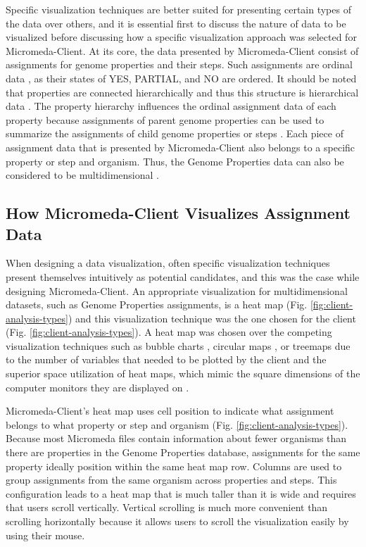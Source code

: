 Specific visualization techniques are better suited for presenting certain types 
of the data over others, and it is essential first to discuss the nature of data to 
be visualized before discussing how a specific visualization approach was 
selected for Micromeda-Client. At its core, the data presented by 
Micromeda-Client consist of assignments for genome properties and their steps. 
Such assignments are ordinal data 
\cite{richardson2018genome,agresti2010analysis}, as their states of YES, 
PARTIAL, and NO are ordered. It should be noted that properties are connected 
hierarchically \cite{richardson2018genome} and thus this structure is 
hierarchical data \cite{richardson2018genome,samet1990applications}. The 
property hierarchy influences the ordinal assignment data of each property 
because assignments of parent genome properties can be used to summarize the 
assignments of child genome properties or steps \cite{richardson2018genome}. 
Each piece of assignment data that is presented by Micromeda-Client also belongs 
to a specific property or step and organism. Thus, the Genome Properties data 
can also be considered to be multidimensional 
\cite{pedersen1999multidimensional}.

\subsection{How Micromeda-Client Visualizes Assignment Data}
\label{client-visualization}

When designing a data visualization, often specific visualization techniques 
present themselves intuitively as potential candidates, and this was the case 
while designing Micromeda-Client. An appropriate visualization for 
multidimensional datasets, such as Genome Properties assignments, is a heat map 
\cite{wilkinson2009history,tufte2001visual}(Fig. 
\ref{fig:client-analysis-types}) and this visualization technique was the one 
chosen for the client (Fig. \ref{fig:client-analysis-types}). A heat map was 
chosen over the competing visualization techniques such as bubble charts 
\cite{tufte2001visual}, circular maps 
\cite{ward2002taxonomy,stothard2004circular}, or treemaps 
\cite{shneiderman1998tree} due to the number of variables that needed to be 
plotted by the client and the superior space utilization of heat maps, which 
mimic the square dimensions of the computer monitors they are displayed on 
\cite{muramalla2017radial}.

Micromeda-Client's heat map uses cell position to indicate what assignment 
belongs to what property or step and organism (Fig. 
\ref{fig:client-analysis-types}). Because most Micromeda files contain 
information about fewer organisms than there are properties in the Genome 
Properties database, assignments for the same property ideally position within 
the same heat map row. Columns are used to group assignments from the same 
organism across properties and steps. This configuration leads to a heat map 
that is much taller than it is wide and requires that users scroll vertically. 
Vertical scrolling is much more convenient than scrolling horizontally because 
it allows users to scroll the visualization easily by using their mouse.

